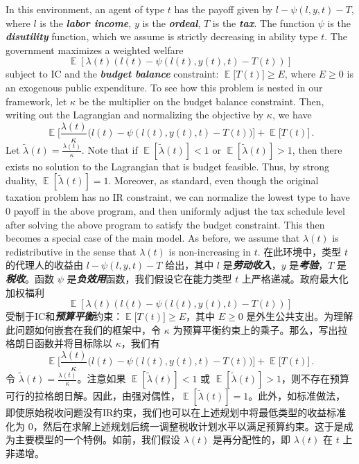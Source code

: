 \documentclass[12pt,letterpaper]{article}
\newenvironment{original}{\color{black}\noindent}{}
\newenvironment{translation}{\color{blue}\noindent}{}
\theoremstyle{plain}
\theoremstyle{definition}
\theoremstyle{remark}
\DeclareMathOperator{\E}{\mathds{E}}
\renewcommand{\1}{\mathds{1}}
\theoremstyle{definition}
\begin{document}
\begin{original}
In this environment, an agent of type $t$ has the payoff given by $l - \psi(l, y, t) -  T$, where $l$ is the \textit{\textbf{labor income}}, $y$ is the \textit{\textbf{ordeal}}, $T$ is the \textit{\textbf{tax}}. The function $\psi$ is the \textit{\textbf{disutility}} function, which we assume is strictly decreasing in ability type $t$. The government maximizes a weighted welfare
\[\E[\lambda (t) (l(t) - \psi(l(t), y(t), t) -  T(t))]\]
subject to IC and the \textit{\textbf{budget balance}} constraint: $ \E\big[T(t)\big] \geq E$, where $E \geq 0$ is an exogenous public expenditure. To see how this problem is nested in our framework, let $\kappa$ be the multiplier on the budget balance constraint.  Then, writing out the Lagrangian and normalizing the objective by $\kappa$, we have
\[\E\Big[\frac{\lambda (t)}{\kappa} \big(l(t) - \psi(l(t), y(t), t) -  T(t)\big)\Big] + \E\Big[T(t)\Big]\,.\]
Let $\tilde{\lambda}(t) = \frac{\lambda (t)}{\kappa}$. Note that if $\E[\tilde{\lambda}(t)] < 1$ or $\E[\tilde{\lambda}(t)] > 1$, then there exists no solution to the Lagrangian that is budget feasible. Thus, by strong duality, $\E[\tilde{\lambda}(t)] = 1$. Moreover, as standard, even though the original taxation problem has no IR constraint, we can normalize the lowest type to have $0$ payoff in the above program, and then uniformly adjust the tax schedule level after solving the above program to satisfy the budget constraint. This then becomes a special case of the main model. As before, we assume that $\lambda(t)$ is redistributive in the sense that $\lambda(t)$ is non-increasing in $t$.
\end{original}
\begin{translation}
在此环境中，类型 $t$ 的代理人的收益由 $l - \psi(l, y, t) -  T$ 给出，其中 $l$ 是\textit{\textbf{劳动收入}}，$y$ 是\textit{\textbf{考验}}，$T$ 是\textit{\textbf{税收}}。函数 $\psi$ 是\textit{\textbf{负效用}}函数，我们假设它在能力类型 $t$ 上严格递减。政府最大化加权福利
\[\E[\lambda (t) (l(t) - \psi(l(t), y(t), t) -  T(t))]\]
受制于IC和\textit{\textbf{预算平衡}}约束：$ \E\big[T(t)\big] \geq E$，其中 $E \geq 0$ 是外生公共支出。为理解此问题如何嵌套在我们的框架中，令 $\kappa$ 为预算平衡约束上的乘子。那么，写出拉格朗日函数并将目标除以 $\kappa$，我们有
\[\E\Big[\frac{\lambda (t)}{\kappa} \big(l(t) - \psi(l(t), y(t), t) -  T(t)\big)\Big] + \E\Big[T(t)\Big]\,.\]
令 $\tilde{\lambda}(t) = \frac{\lambda (t)}{\kappa}$。注意如果 $\E[\tilde{\lambda}(t)] < 1$ 或 $\E[\tilde{\lambda}(t)] > 1$，则不存在预算可行的拉格朗日解。因此，由强对偶性，$\E[\tilde{\lambda}(t)] = 1$。此外，如标准做法，即使原始税收问题没有IR约束，我们也可以在上述规划中将最低类型的收益标准化为 $0$，然后在求解上述规划后统一调整税收计划水平以满足预算约束。这于是成为主要模型的一个特例。如前，我们假设 $\lambda(t)$ 是再分配性的，即 $\lambda(t)$ 在 $t$ 上非递增。
\end{translation}
\end{document}
